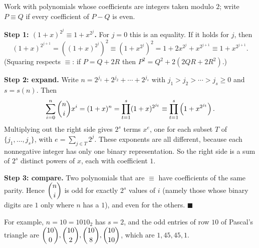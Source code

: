 Work with polynomials whose coefficients are integers taken modulo $2$; write $P\equiv Q$ if every coefficient of $P-Q$ is even.

\textbf{Step 1: $(1+x)^{2^j}\equiv1+x^{2^j}$.} For $j=0$ this is an equality. If it holds for $j$, then
\[
(1+x)^{2^{j+1}}=\left((1+x)^{2^j}\right)^2\equiv\left(1+x^{2^j}\right)^2=1+2x^{2^j}+x^{2^{j+1}}\equiv1+x^{2^{j+1}} .
\]
(Squaring respects $\equiv$: if $P=Q+2R$ then $P^2=Q^2+2(2QR+2R^2)$.)

\textbf{Step 2: expand.} Write $n=2^{j_1}+2^{j_2}+\cdots+2^{j_s}$ with $j_1>j_2>\cdots>j_s\ge0$ and $s=s(n)$. Then
\[
\sum_{i=0}^n\dbinom ni x^i=(1+x)^n=\prod_{t=1}^{s}(1+x)^{2^{j_t}}\equiv\prod_{t=1}^{s}\left(1+x^{2^{j_t}}\right).
\]
Multiplying out the right side gives $2^s$ terms $x^{e}$, one for each subset $T$ of $\{j_1,\dots,j_s\}$, with $e=\sum_{j\in T}2^j$. These exponents are all different, because each nonnegative integer has only one binary representation. So the right side is a sum of $2^s$ distinct powers of $x$, each with coefficient $1$.

\textbf{Step 3: compare.} Two polynomials that are $\equiv$ have coefficients of the same parity. Hence $\dbinom ni$ is odd for exactly $2^{s}$ values of $i$ (namely those whose binary digits are $1$ only where $n$ has a $1$), and even for the others. $\blacksquare$

For example, $n=10=1010_2$ has $s=2$, and the odd entries of row $10$ of Pascal's triangle are $\dbinom{10}{0},\dbinom{10}{2},\dbinom{10}{8},\dbinom{10}{10}$, which are $1,45,45,1$.
